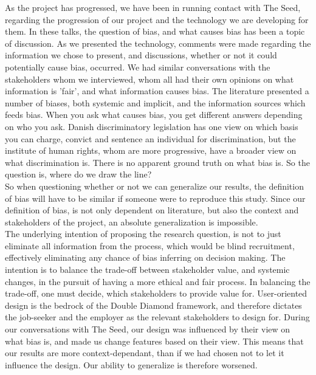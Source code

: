 As the project has progressed, we have been in running contact with The Seed, regarding the progression of our project and the technology we are developing for them. In these talks, the question of bias, and what causes bias has been a topic of discussion. As we presented the technology, comments were made regarding the information we chose to present, and discussions, whether or not it could potentially cause bias, occurred. We had similar conversations with the stakeholders whom we interviewed, whom all had their own opinions on what information is 'fair', and what information causes bias. The literature presented a number of biases, both systemic and implicit, and the information sources which feeds bias. When you ask what causes bias, you get different answers depending on who you ask. Danish discriminatory legislation has one view on which basis you can charge, convict and sentence an individual for discrimination, but the institute of human rights, whom are more progressive, have a broader view on what discrimination is. There is no apparent ground truth on what bias is. So the question is, where do we draw the line?\\

So when questioning whether or not we can generalize our results, the definition of bias will have to be similar if someone were to reproduce this study. Since our definition of bias, is not only dependent on literature, but also the context and stakeholders of the project, an absolute generalization is impossible. \\

The underlying intention of proposing the research question, is not to just eliminate all information from the process, which would be blind recruitment, effectively eliminating any chance of bias inferring on decision making. The intention is to balance the trade-off between stakeholder value, and systemic changes, in the pursuit of having a more ethical and fair process. In balancing the trade-off, one must decide, which stakeholders to provide value for. User-oriented design is the bedrock of the Double Diamond framework, and therefore dictates the job-seeker and the employer as the relevant stakeholders to design for. During our conversations with The Seed, our design was influenced by their view on what bias is, and made us change features based on their view. This means that our results are more context-dependant, than if we had chosen not to let it influence the design. Our ability to generalize is therefore worsened. \\

